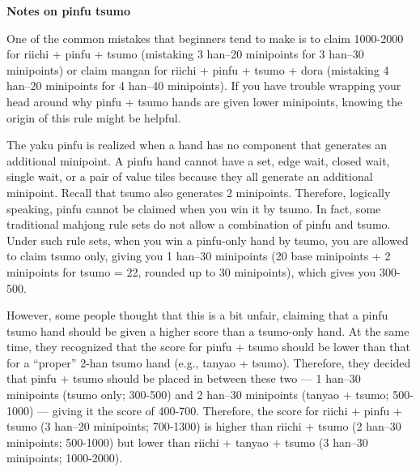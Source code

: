 \newpage
\begin{boxnote} \small
{\bf\normalsize Notes on {\jap pinfu tsumo}}
\bigskip

One of the common mistakes that beginners tend to make is to claim 1000-2000 for riichi + {\jap pinfu + tsumo} (mistaking 3 {\jap han}--20 minipoints for 3 {\jap han}--30 minipoints) or claim {\jap mangan} for riichi + {\jap pinfu + tsumo + dora} (mistaking 4 {\jap han}--20 minipoints for 4 {\jap han}--40 minipoints). 
If you have trouble wrapping your head around why {\jap pinfu + tsumo} hands are given lower minipoints, knowing the origin of this rule might be helpful. 
\bigskip

The {\jap yaku} {\jap pinfu} is realized when a hand has no component that generates an additional minipoint. A {\jap pinfu} hand cannot have a set, edge wait, closed wait, single wait, or a pair of value tiles because they all generate an additional minipoint. Recall that {\jap tsumo} also generates 2 minipoints. Therefore, logically speaking, {\jap pinfu} cannot be claimed when you win it by {\jap tsumo}. In fact, some traditional mahjong rule sets do not allow a combination of {\jap pinfu} and {\jap tsumo}. 
Under such rule sets, when you win a {\jap pinfu}-only hand by {\jap tsumo}, you are allowed to claim {\jap tsumo} only, giving you 1 {\jap han}--30 minipoints (20 base minipoints + 2 minipoints for {\jap tsumo} = 22, rounded up to 30 minipoints), which gives you 300-500.  

%
%
\bigskip
However, some people thought that this is a bit unfair, claiming that a {\jap pinfu tsumo} hand should be given a higher score than a {\jap tsumo}-only hand. At the same time, they recognized that the score for {\jap pinfu + tsumo} should be lower than that for a ``proper'' 2-{\jap han} {\jap tsumo} hand (e.g., {\jap tanyao + tsumo}). 
Therefore, they decided that {\jap pinfu + tsumo} should be placed in between these two --- 1 {\jap han}--30 minipoints ({\jap tsumo} only; 300-500) and 2 {\jap han}--30 minipoints ({\jap tanyao + tsumo}; 500-1000) --- giving it the score of 400-700. Therefore, the score for riichi + {\jap pinfu + tsumo} (3 {\jap han}--20 minipoints; 700-1300) is higher than riichi + {\jap tsumo} (2 {\jap han}--30 minipoints; 500-1000) but lower than riichi + {\jap tanyao + tsumo} (3 {\jap han}--30 minipoints; 1000-2000). 
\end{boxnote}

